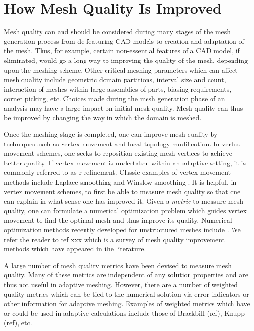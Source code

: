 \documentclass[letter]{report}
\begin{document}
\section{How Mesh Quality Is Improved}
Mesh quality can and should be considered during many stages of 
the mesh generation process from de-featuring CAD models to  
creation and adaptation of the mesh. Thus, for example, certain
non-essential features of a CAD model, if eliminated, would go a 
long way to improving the quality of the mesh, depending upon
the meshing scheme. Other critical meshing parameters which can 
affect mesh quality include geometric domain partitions, interval size
and count, interaction of meshes within large assemblies of parts, 
biasing requirements, corner picking, etc. Choices made during the 
mesh generation phase of an analysis may have a large impact on 
initial mesh quality.  Mesh quality can thus be improved by changing the 
way in which the domain is meshed. \newline

Once the meshing stage is completed, one can improve mesh quality
by techniques such as vertex movement and local topology modification.
In vertex movement schemes, one seeks to reposition existing mesh vertices to 
achieve better quality. If vertex movement is undertaken within an adaptive 
setting, it is commonly referred to as r-refinement. 
Classic examples of vertex movement methods 
include Laplace smoothing \cite{F88} and Winslow smoothing \cite{Winslow}. 
It is helpful, in vertex movement schemes, to first be 
able to measure mesh quality so that one can explain in what sense one 
has improved it. Given a {\it metric} to measure mesh quality, 
one can formulate a numerical 
optimization problem which guides vertex movement to find the optimal 
mesh and thus improve its quality.  Numerical 
optimization methods recently
developed for unstructured meshes include \cite{Opt-MS,Kn00,FrKn01,
FeasNewt,bjoe:swap,bjoe:chain-swap,es92}. We refer the reader to ref xxx
which is a survey of mesh quality improvement methods which have appeared 
in the literature. \newline

A large number of mesh quality metrics have been devised to measure 
mesh quality. Many of these metrics are independent of any solution 
properties and are thus not useful in adaptive meshing. However, there
are a number of weighted quality metrics which can be tied to the 
numerical solution via error indicators or other information for adaptive 
meshing. Examples of weighted metrics which have or could be used in 
adaptive calculations include those of Brackbill (ref), Knupp (ref), etc. \newline
\end{document}
